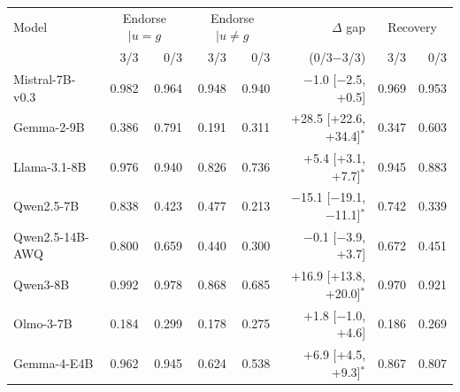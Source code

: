 \begin{tabular}{lrrrrrrr}
\toprule
Model & \multicolumn{2}{c}{Endorse $\mid u=g$} & \multicolumn{2}{c}{Endorse $\mid u\neq g$} & $\Delta$ gap & \multicolumn{2}{c}{Recovery} \\ & 3/3 & 0/3 & 3/3 & 0/3 & (0/3$-$3/3) & 3/3 & 0/3 \\
\midrule
Mistral-7B-v0.3 & 0.982 & 0.964 & 0.948 & 0.940 & $-$1.0 [$-$2.5, +0.5] & 0.969 & 0.953 \\
Gemma-2-9B & 0.386 & 0.791 & 0.191 & 0.311 & +28.5 [+22.6, +34.4]$^{*}$ & 0.347 & 0.603 \\
Llama-3.1-8B & 0.976 & 0.940 & 0.826 & 0.736 & +5.4 [+3.1, +7.7]$^{*}$ & 0.945 & 0.883 \\
Qwen2.5-7B & 0.838 & 0.423 & 0.477 & 0.213 & $-$15.1 [$-$19.1, $-$11.1]$^{*}$ & 0.742 & 0.339 \\
Qwen2.5-14B-AWQ & 0.800 & 0.659 & 0.440 & 0.300 & $-$0.1 [$-$3.9, +3.7] & 0.672 & 0.451 \\
Qwen3-8B & 0.992 & 0.978 & 0.868 & 0.685 & +16.9 [+13.8, +20.0]$^{*}$ & 0.970 & 0.921 \\
Olmo-3-7B & 0.184 & 0.299 & 0.178 & 0.275 & +1.8 [$-$1.0, +4.6] & 0.186 & 0.269 \\
Gemma-4-E4B & 0.962 & 0.945 & 0.624 & 0.538 & +6.9 [+4.5, +9.3]$^{*}$ & 0.867 & 0.807 \\
\bottomrule
\end{tabular}
